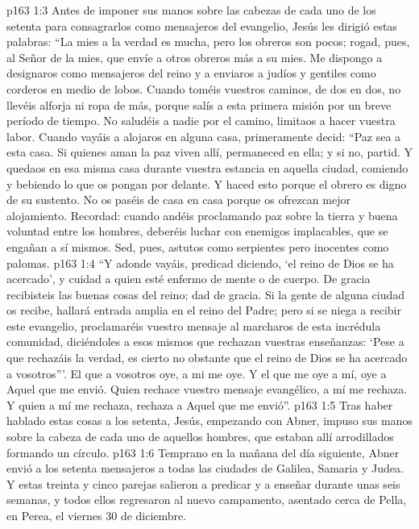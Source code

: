\vs p163 1:3 Antes de imponer sus manos sobre las cabezas de cada uno de los setenta para consagrarlos como mensajeros del evangelio, Jesús les dirigió estas palabras: “La mies a la verdad es mucha, pero los obreros son pocos; rogad, pues, al Señor de la mies, que envíe a otros obreros más a su mies. Me dispongo a designaros como mensajeros del reino y a enviaros a judíos y gentiles como corderos en medio de lobos. Cuando toméis vuestros caminos, de dos en dos, no llevéis alforja ni ropa de más, porque salís a esta primera misión por un breve período de tiempo. No saludéis a nadie por el camino, limitaos a hacer vuestra labor. Cuando vayáis a alojaros en alguna casa, primeramente decid: “Paz sea a esta casa. Si quienes aman la paz viven allí, permaneced en ella; y si no, partid. Y quedaos en esa misma casa durante vuestra estancia en aquella ciudad, comiendo y bebiendo lo que os pongan por delante. Y haced esto porque el obrero es digno de su sustento. No os paséis de casa en casa porque os ofrezcan mejor alojamiento. Recordad: cuando andéis proclamando paz sobre la tierra y buena voluntad entre los hombres, deberéis luchar con enemigos implacables, que se engañan a sí mismos. Sed, pues, astutos como serpientes pero inocentes como palomas.
\vs p163 1:4 “Y adonde vayáis, predicad diciendo, ‘el reino de Dios se ha acercado’, y cuidad a quien esté enfermo de mente o de cuerpo. De gracia recibisteis las buenas cosas del reino; dad de gracia. Si la gente de alguna ciudad os recibe, hallará entrada amplia en el reino del Padre; pero si se niega a recibir este evangelio, proclamaréis vuestro mensaje al marcharos de esta incrédula comunidad, diciéndoles a esos mismos que rechazan vuestras enseñanzas: ‘Pese a que rechazáis la verdad, es cierto no obstante que el reino de Dios se ha acercado a vosotros”’. El que a vosotros oye, a mi me oye. Y el que me oye a mí, oye a Aquel que me envió. Quien rechace vuestro mensaje evangélico, a mí me rechaza. Y quien a mí me rechaza, rechaza a Aquel que me envió”.
\vs p163 1:5 Tras haber hablado estas cosas a los setenta, Jesús, empezando con Abner, impuso sus manos sobre la cabeza de cada uno de aquellos hombres, que estaban allí arrodillados formando un círculo.
\vs p163 1:6 Temprano en la mañana del día siguiente, Abner envió a los setenta mensajeros a todas las ciudades de Galilea, Samaria y Judea. Y estas treinta y cinco parejas salieron a predicar y a enseñar durante unas seis semanas, y todos ellos regresaron al nuevo campamento, asentado cerca de Pella, en Perea, el viernes 30 de diciembre.
